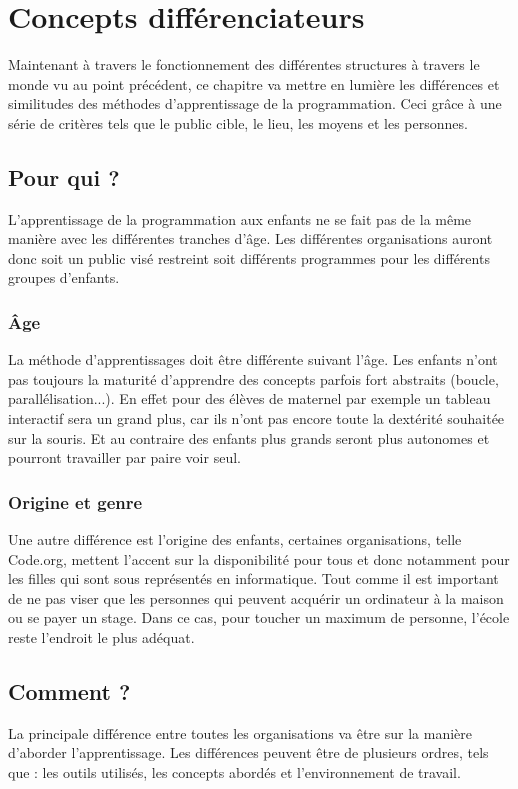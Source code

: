 \section{Concepts différenciateurs}
\label{concepts}
Maintenant à travers le fonctionnement des  différentes structures à travers le monde vu au point précédent, ce chapitre va mettre en lumière les différences et similitudes des méthodes d'apprentissage de la programmation. Ceci grâce à une série de critères tels que le public cible, le lieu, les moyens et les personnes.
\subsection{Pour qui ?}
L'apprentissage de la programmation aux enfants ne se fait pas de la même manière avec les différentes tranches d'âge. Les différentes organisations auront donc soit un public visé restreint soit différents programmes pour les différents groupes d'enfants. 

\subsubsection{Âge}
La méthode d'apprentissages doit être différente suivant l'âge. Les enfants n'ont pas toujours la maturité d'apprendre des concepts parfois fort abstraits (boucle, parallélisation...). En effet pour des élèves de maternel par exemple un tableau interactif sera un grand plus, car ils n'ont pas encore toute la dextérité souhaitée sur la souris. Et au contraire des enfants plus grands seront plus autonomes et pourront travailler par paire voir seul.

\subsubsection{Origine et genre}
Une autre différence est l'origine des enfants, certaines organisations, telle Code.org, mettent l'accent sur la disponibilité pour tous et donc notamment pour les filles qui sont sous représentés en informatique. Tout comme il est important de ne pas viser que les personnes qui peuvent acquérir un ordinateur à la maison ou se payer un stage. Dans ce cas, pour toucher un maximum de personne, l'école reste l'endroit le plus adéquat.

\subsection{Comment ?}
La principale différence entre toutes les organisations va être sur la manière d'aborder l'apprentissage. Les différences peuvent être de plusieurs ordres, tels que : les outils utilisés, les concepts abordés et l'environnement de travail.

